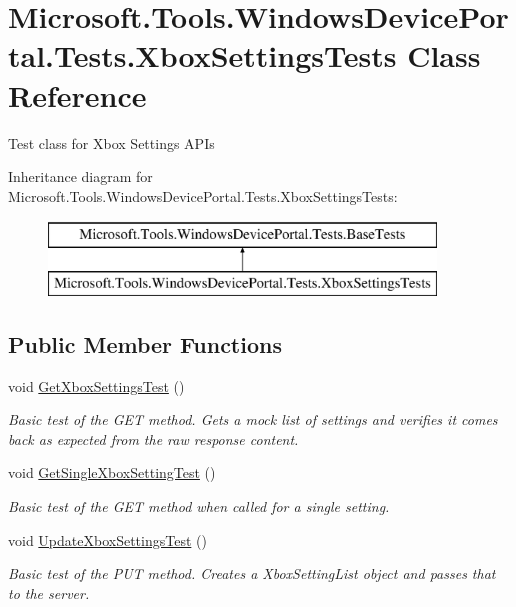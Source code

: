 \hypertarget{class_microsoft_1_1_tools_1_1_windows_device_portal_1_1_tests_1_1_xbox_settings_tests}{}\section{Microsoft.\+Tools.\+Windows\+Device\+Portal.\+Tests.\+Xbox\+Settings\+Tests Class Reference}
\label{class_microsoft_1_1_tools_1_1_windows_device_portal_1_1_tests_1_1_xbox_settings_tests}


Test class for Xbox Settings A\+P\+Is  


Inheritance diagram for Microsoft.\+Tools.\+Windows\+Device\+Portal.\+Tests.\+Xbox\+Settings\+Tests\+:\begin{figure}[H]
\begin{center}
\leavevmode
\includegraphics[height=2.000000cm]{class_microsoft_1_1_tools_1_1_windows_device_portal_1_1_tests_1_1_xbox_settings_tests}
\end{center}
\end{figure}
\subsection*{Public Member Functions}
\begin{DoxyCompactItemize}
\item 
void \hyperlink{class_microsoft_1_1_tools_1_1_windows_device_portal_1_1_tests_1_1_xbox_settings_tests_a77bdf3ab7ff44fe5df0c1b2a2f486009}{Get\+Xbox\+Settings\+Test} ()
\begin{DoxyCompactList}\small\item\em Basic test of the G\+ET method. Gets a mock list of settings and verifies it comes back as expected from the raw response content. \end{DoxyCompactList}\item 
void \hyperlink{class_microsoft_1_1_tools_1_1_windows_device_portal_1_1_tests_1_1_xbox_settings_tests_ad63506f099b1c2753d3fc72d68ce673b}{Get\+Single\+Xbox\+Setting\+Test} ()
\begin{DoxyCompactList}\small\item\em Basic test of the G\+ET method when called for a single setting. \end{DoxyCompactList}\item 
void \hyperlink{class_microsoft_1_1_tools_1_1_windows_device_portal_1_1_tests_1_1_xbox_settings_tests_a100b575cc8b07d4ee00161231af3644d}{Update\+Xbox\+Settings\+Test} ()
\begin{DoxyCompactList}\small\item\em Basic test of the P\+UT method. Creates a Xbox\+Setting\+List object and passes that to the server. \end{DoxyCompactList}\end{DoxyCompactItemize}
